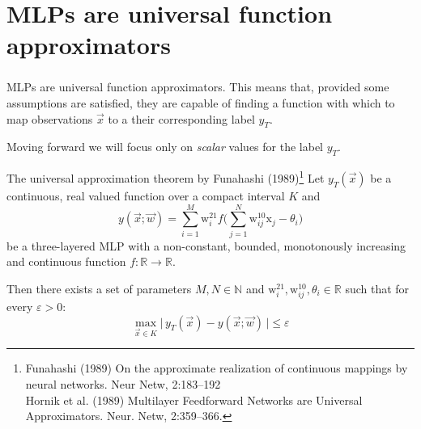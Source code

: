 \section{MLPs are universal function approximators}

\begin{frame}\frametitle{\subsecname}

MLPs are universal function approximators. This means that, provided some assumptions are satisfied, they are capable of finding a function with which to map observations $\vec x$ to a their corresponding label $y_T$.

Moving forward we will focus only on \emph{scalar} values for the label $y_T$.

   \begin{block}{The universal approximation theorem by Funahashi (1989)\footnote
	{ Funahashi (1989) On the approximate realization of 
		continuous mappings by neural networks. Neur Netw, 2:183--192\\
		Hornik et al. (1989) Multilayer Feedforward Networks 
		are Universal Approximators. Neur. Netw, 2:359--366. }}
	\small
    	Let $y_T{(\vec{x})}$ be a continuous, real valued function 
    	over a compact interval $K$ and     
		\begin{equation} 
		{y}{(\vec{x}; \vec w)} = \sum_{i=1}^M \mathrm{w}_i^{21} 
		f\Big( \sum\limits_{j=1}^N \mathrm{w}_{ij}^{10} 
		  \mathrm{x}_j - \theta_i \Big)
		 \end{equation}
    	be a three-layered MLP with a non-constant, bounded, 
    	monotonously increasing and continuous function 
    	$f: \mathbb{R} \rightarrow \mathbb{R}$.\\
		\vspace{4mm}
	   \pause

		Then there exists a set of parameters 
		$M, N \in \mathbb{N}$ and $\mathrm{w}_i^{21}, 
		\mathrm{w}_{ij}^{10}, \theta_i \in \mathbb{R}$ 
		such that for every $\varepsilon > 0$:
		\begin{equation}
		\max_{\vec{x} \in K} \Big| \, y_T{(\vec{x})} - {y}{(\vec{x}; \vec w)} \,\Big| 
		\leq \varepsilon
		 \end{equation}
  \end{block}
  
\end{frame}

